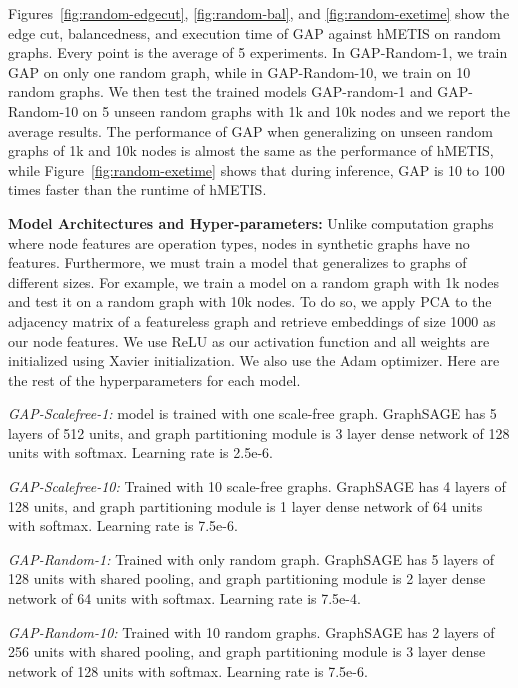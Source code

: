 \documentclass[10pt,twocolumn]{article}
\begin{document}
Figures~\ref{fig:random-edgecut}, \ref{fig:random-bal}, and \ref{fig:random-exetime} show the edge cut, balancedness, and execution time of GAP against hMETIS on random graphs. Every point is the average of 5 experiments. 
In GAP-Random-1, we train GAP on only one random graph, while in GAP-Random-10, we train on 10 random graphs. We then test the trained models GAP-random-1 and GAP-Random-10 on 5 unseen random graphs with 1k and 10k nodes and we report the average results. The performance of GAP when generalizing on unseen random graphs of 1k and 10k nodes is almost the same as the performance of hMETIS, while Figure~\ref{fig:random-exetime} shows that during inference, GAP is 10 to 100 times faster than the runtime of hMETIS.

\noindent\textbf{Model Architectures and Hyper-parameters:}
Unlike computation graphs where node features are operation types, nodes in synthetic graphs have no features. Furthermore, we must train a model that generalizes to graphs of different sizes. For example, we train a model on a random graph with 1k nodes and test it on a random graph with 10k nodes. To do so, we apply PCA to the adjacency matrix of a featureless graph and retrieve embeddings of size 1000 as our node features. We use ReLU as our activation function and all weights are initialized using Xavier initialization. We also use the Adam optimizer. Here are the rest of the hyperparameters for each model.

\noindent\emph{GAP-Scalefree-1:} model is trained with one scale-free graph. GraphSAGE has 5 layers of 512 units, and graph partitioning module is 3 layer dense network of 128 units with softmax. Learning rate is 2.5e-6.
    
\noindent\emph{GAP-Scalefree-10:} Trained with 10 scale-free graphs. GraphSAGE has 4 layers of 128 units, and graph partitioning module is 1 layer dense network of 64 units with softmax. Learning rate is 7.5e-6.
    
\noindent\emph{GAP-Random-1:} Trained with only random graph. GraphSAGE has 5 layers of 128 units with shared pooling, and graph partitioning module is 2 layer dense network of 64 units with softmax. Learning rate is 7.5e-4.
    
\noindent\emph{GAP-Random-10:} Trained with 10 random graphs. GraphSAGE has 2 layers of 256 units with shared pooling, and graph partitioning module is 3 layer dense network of 128 units with softmax. Learning rate is 7.5e-6.
\end{document}
